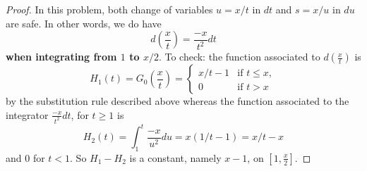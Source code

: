 \documentclass[12pt]{article}
\begin{document}
\begin{proof}
In this problem, both change of variables $u = x/t$ in $dt$ and $s = x/u$ in $du$ are safe. In other words, we do have
$$d\left(\frac{x}{t}\right) = \frac{-x}{t^2} dt$$
\textbf{when integrating from $1$ to $x/2$}. To check: the function associated to $d\left(\frac{x}{t}\right)$ is
$$H_1(t) = G_0\left(\frac{x}{t}\right) = \begin{cases} x/t - 1 &\text{if } t \leq x, \\ 0 &\text{if } t > x\end{cases}$$
by the substitution rule described above whereas the function associated to the integrator $\frac{-x}{t^2} dt$, for $t \geq 1$ is
$$H_2(t) = \int_1^{t} \frac{-x}{u^2} du = x (1/t - 1) = x/t - x$$
and 0 for $t < 1$. So $H_1 - H_2$ is a constant, namely $x - 1$, on $[1, \frac{x}{2}]$.
\end{proof}

\unless\ifdefined\IsMainDocument
\end{document}
